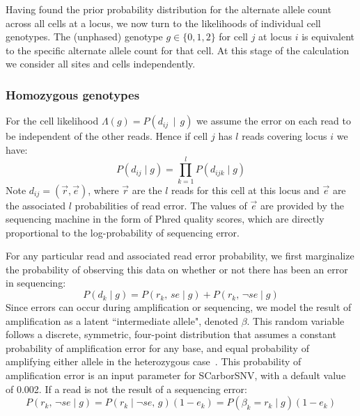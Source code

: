 \documentclass[../../main.tex]{subfiles}
\begin{document}

Having found the prior probability distribution for the alternate allele count across all cells at a locus, we now turn to the likelihoods of individual cell genotypes.
The (unphased) genotype $g\in\{0,1,2\}$ for cell $j$ at locus $i$ is equivalent to the specific alternate allele count for that cell.
At this stage of the calculation we consider all sites and cells independently.
\subsubsection*{Homozygous genotypes}
For the cell likelihood $\Lambda(g) = P(d_{ij}\,\mid\,g)$ we assume the error on each read to be independent of the other reads.
Hence if cell $j$ has $l$ reads covering locus $i$ we have:
\begin{equation*}
    P(d_{ij}\mid g) = \prod_{k=1}^l P(d_{ijk} \mid g)
\end{equation*}
Note $d_{ij}=(\vec{r},\vec{e})$, where $\vec{r}$ are the $l$ reads for this cell at this locus and $\vec{e}$ are the associated $l$ probabilities of read error.
The values of $\vec{e}$ are provided by the sequencing machine in the form of Phred quality scores, which are directly proportional to the log-probability of sequencing error. 

For any particular read and associated read error probability, we first marginalize the probability of observing this data on whether or not there has been an error in sequencing:
\begin{equation*}
    P(d_{k} \mid g) =  P(r_k,\,se \mid g) + P(r_k,\,\neg se \mid g)
\end{equation*}
Since errors can occur during amplification or sequencing, we model the result of amplification as a latent ``intermediate allele", denoted $\beta$.
This random variable follows a discrete, symmetric, four-point distribution that assumes a constant probability of amplification error for any base, and equal probability of amplifying either allele in the heterozygous case~\cite{monovar}.
This probability of amplification error is an input parameter for SCarborSNV, with a default value of 0.002.
If a read is not the result of a sequencing error:
\begin{equation*}
    P(r_k,\,\neg se \mid g) = P(r_k\mid \neg se ,\, g)(1-e_k)=P(\beta_k=r_k\mid g)(1-e_k) 
\end{equation*}
\end{document}
